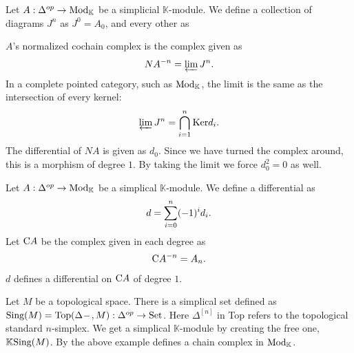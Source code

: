 \documentclass[../thesis.tex]{subfiles}
\begin{document}
            \begin{example}
                Let $A : \Delta^{op} \rightarrow \tt{Mod}_\mathbb{K}$ be a simplicial $\mathbb{K}$-module.  We define a collection of diagrams $J^n$ as $J^0 = A_0$, and every other as
                \begin{center}
                \end{center}
                $A$'s normalized cochain complex is the complex given as
                \begin{align*}
                    NA^{-n} = \varprojlim J^n\tt{.}
                \end{align*}
                In a complete pointed category, such as $\tt{Mod}_\mathbb{K}$, the limit is the same as the intersection of every kernel:
                \begin{align*}
                    \varprojlim J^n = \bigcap_{i=1}^n\tt{Ker}d_i\tt{.}
                \end{align*}
                The differential of $NA$ is given as $d_0$. Since we have turned the complex around, this is a morphism of degree $1$. By taking the limit we force $d_0^2 = 0$ as well.
            \end{example}
            \begin{example}
                Let $A : \Delta^{op} \rightarrow \tt{Mod}_\mathbb{K}$ be a simplical $\mathbb{K}$-module. We define a differential as
                \begin{align*}
                    d = \sum_{i=0}^n(-1)^id_i\tt{.}
                \end{align*}
                Let $\tt{C}A$ be the complex given in each degree as
                \begin{align*}
                    \tt{C}A^{-n} = A_n\tt{.}
                \end{align*}
                $d$ defines a differential on $\tt{C}A$ of degree $1$.
            \end{example}
            \begin{example}
                Let $M$ be a topological space. There is a simplical set defined as $\tt{Sing}(M) = \tt{Top}(\Delta^{\argument},M) : \Delta^{op} \rightarrow \tt{Set}$. Here $\Delta^{[n]}$ in Top refers to the topological standard $n$-simplex. We get a simplical $\mathbb{K}$-module by creating the free one, $\mathbb{K}\tt{Sing}(M)$. By the above example defines a chain complex in $\tt{Mod}_\mathbb{K}$.
            \end{example}
\end{document}
